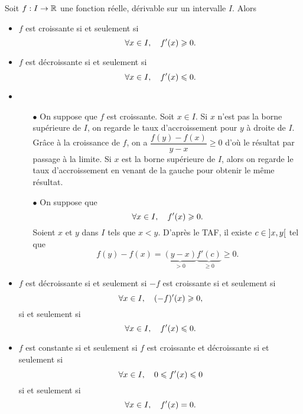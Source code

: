 \documentclass{magnolia}
\begin{document}
\begin{proposition}[utile=-3]
Soit $f:I\to\mathbb{R}$ une fonction réelle, dérivable sur un intervalle $I$. Alors
\begin{itemize}
\item $f$ est croissante si et seulement si
  \[\forall x\in I ,\quad f'(x)\geqslant 0.\]
\item $f$ est décroissante si et seulement si
  \[\forall x\in I ,\quad f'(x)\leqslant 0.\]
\end{itemize}
\end{proposition}

\begin{preuve}
\begin{itemize}
\item 
\begin{itemize}
\item[$\bullet$] On suppose que $f$ est croissante. Soit $x\in I$. Si $x$ n'est pas la borne supérieure de $I$, on regarde le taux d'accroissement pour $y$ à droite de $I$. Grâce à la croissance de $f$, on a $\dfrac{f(y)-f(x)}{y-x}\geq 0$ d'où le résultat par passage à la limite.
Si $x$ est la borne supérieure de $I$, alors on regarde le taux d'accroissement en venant de la gauche pour obtenir le même résultat.
\item[$\bullet$] On suppose que 
  \[\forall x\in I ,\quad f'(x)\geqslant 0.\]
  Soient $x$ et $y$ dans $I$ tels que $x<y$. D'après le TAF, il existe $c\in \left]x,y\right[$ tel que $$f(y)-f(x)=\underbrace{(y-x)}_{>0}\underbrace{f'(c)}_{\geq 0}\geq 0.$$
\end{itemize}
\item $f$ est décroissante si et seulement si $-f$ est croissante si et seulement si \[\forall x\in I ,\quad (-f)'(x)\geqslant 0,\] si et seulement si
  \[\forall x\in I ,\quad f'(x)\leqslant 0.\]
\item $f$ est constante si et seulement si $f$ est croissante et décroissante si et seulement si \[\forall x\in I ,\quad 0\leqslant f'(x)\leqslant 0\] si et seulement si
  \[\forall x\in I ,\quad f'(x)=0.\]
\end{itemize}
\end{preuve}
\end{document}
